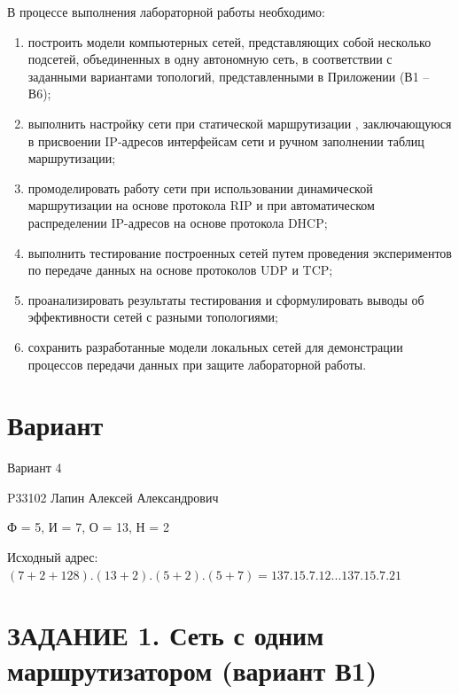 \documentclass[12pt,onecolumn]{article}
\begin{document}
В процессе выполнения лабораторной работы необходимо:

\begin{enumerate}
    \item построить модели компьютерных сетей, представляющих собой несколько подсетей, объединенных в одну автономную сеть, в соответствии с заданными вариантами топологий, представленными в Приложении (В1 -- В6);
    \item выполнить настройку сети при статической маршрутизации , заключающуюся в присвоении IP-адресов интерфейсам сети и ручном заполнении таблиц маршрутизации;
    \item промоделировать работу сети при использовании динамической маршрутизации на основе протокола RIP и при автоматическом распределении IP-адресов на основе протокола DHCP;
    \item выполнить тестирование построенных сетей путем проведения экспериментов по передаче данных на основе протоколов UDP и TCP;
    \item проанализировать результаты тестирования и сформулировать выводы об эффективности сетей с разными топологиями;
    \item сохранить разработанные модели локальных сетей для демонстрации процессов передачи данных при защите лабораторной работы.
\end{enumerate}
\section*{Вариант}
Вариант 4

P33102 Лапин Алексей Александрович

Ф = 5, И = 7, О = 13, Н = 2

Исходный адрес: $(7 + 2 + 128).(13+2).(5+2).(5+7) = 137.15.7.12 ... 137.15.7.21$
\section{ЗАДАНИЕ 1. Сеть с одним маршрутизатором (вариант В1)}
\end{document}
